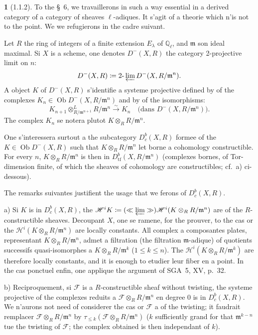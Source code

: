 \documentclass[12pt,a4paper]{article}
\theoremstyle{plain}
\theoremstyle{definition}
\theoremstyle{definition}
\newtheorem{para}{}[section]
\theoremstyle{remark}
\DeclareMathOperator{\Ob}{Ob}
\newcommand{\limproj}{\varprojlim}
\begin{document}
\begin{para}[1.1.2]
To the \S~6, we travaillerons in such a way essential in a derived category of a category of sheaves $\ell$-adiques. It s'agit of a theorie which n'is not to the point. We we refugierons in the cadre suivant.

Let $R$ the ring of integers of a finite extension $E_\lambda$ of $\mathbb{Q}_\ell$, and $\mathfrak{m}$ son ideal maximal. Si $X$ is a scheme, one denotes $D^-(X, R)$ the category 2-projective limit on $n$:
\[D^-(X, R) \coloneqq 2\text{-}\limproj D^-(X, R/\mathfrak{m}^n).\]
A object $K$ of $D^-(X, R)$ s'identifie a systeme projective defined by of the complexes $K_n \in \Ob D^-(X, R/\mathfrak{m}^n)$ and by of the isomorphisms:
\[K_{n+1} \otimes^L_{R/\mathfrak{m}^{n+1}} R/\mathfrak{m}^n \xrightarrow{\sim} K_n \quad \text{(dans } D^-(X, R/\mathfrak{m}^n)\text{)}.\]
The complex $K_n$ se notera plutot $K \otimes_R R/\mathfrak{m}^n$.

One s'interessera surtout a the subcategory $D^b_c(X, R)$ formee of the $K \in \Ob D^-(X, R)$ such that $K \otimes_R R/\mathfrak{m}^n$ let borne a cohomology constructible. For every $n$, $K \otimes_R R/\mathfrak{m}^n$ is then in $D^b_{\text{tf}}(X, R/\mathfrak{m}^n)$ (complexes bornes, of Tor-dimension finite, of which the sheaves of cohomology are constructibles; cf.~a) ci-dessous).

The remarks suivantes justifient the usage that we ferons of $D^b_c(X, R)$.

a) Si $K$ is in $D^b_c(X, R)$, the $\mathscr{H}^i K \coloneqq (\ll \limproj \gg) \mathscr{H}^i(K \otimes_R R/\mathfrak{m}^n)$ are of the $R$-constructible sheaves. Decoupant $X$, one se ramene, for the prouver, to the cas or the $\mathscr{H}^i(K \otimes_R R/\mathfrak{m}^n)$ are locally constants. All complex a composantes plates, representant $K \otimes_R R/\mathfrak{m}^n$, admet a filtration (the filtration $\mathfrak{m}$-adique) of quotients successifs quasi-isomorphes a $K \otimes_R R/\mathfrak{m}^k$ ($1 \leq k \leq n$). The $\mathscr{H}^i(K \otimes_R R/\mathfrak{m}^k)$ are therefore locally constants, and it is enough to etudier leur fiber en a point. In the cas ponctuel enfin, one applique the argument of SGA~5, XV, p.~32.

b) Reciproquement, si $\mathscr{F}$ is a $R$-constructible sheaf without twisting, the systeme projective of the complexes reduits a $\mathscr{F} \otimes_R R/\mathfrak{m}^n$ en degree $0$ is in $D^b_c(X, R)$. We n'aurons not need of considerer the cas or $\mathscr{F}$ a of the twisting; it faudrait remplacer $\mathscr{F} \otimes_R R/\mathfrak{m}^n$ by $\tau_{\leq k}(\mathscr{F} \otimes_R R/\mathfrak{m}^n)$ ($k$ sufficiently grand for that $\mathfrak{m}^{k-n}$ tue the twisting of $\mathscr{F}$; the complex obtained is then independant of $k$).


\end{para}
\end{document}

